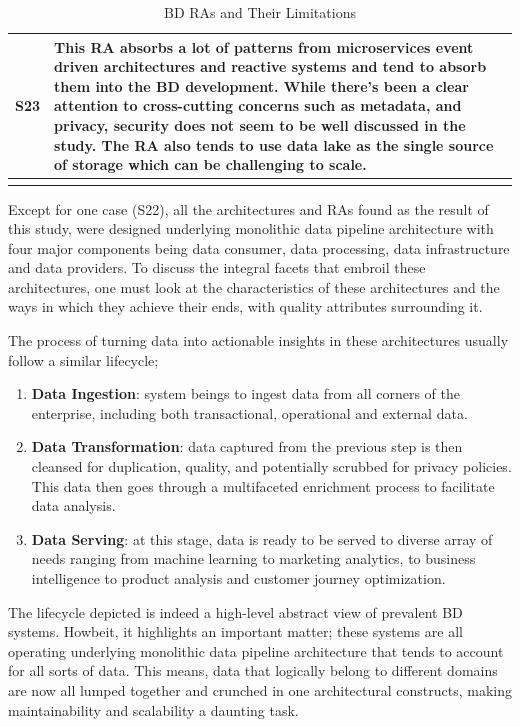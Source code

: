 \documentclass[review]{elsarticle}
\begin{document}
\begin{longtable}{|p{0.5cm}|p{11cm}|}
        \hline
        S23 & This RA absorbs a lot of patterns from microservices event driven architectures and reactive systems and tend to absorb them into the BD development. While there's been a clear attention to cross-cutting concerns such as metadata, and privacy, security does not seem to be well discussed in the study. The RA also tends to use data lake as the single source of storage which can be challenging to scale.  \\
        \hline
        \caption{BD RAs and Their Limitations}
        \label{table:BD-RAs-Limitations}
\end{longtable}

Except for one case (S22), all the architectures and RAs found as the result of this study, were designed underlying monolithic data pipeline architecture with four major components being data consumer, data processing, data infrastructure and data providers. To discuss the integral facets that embroil these architectures, one must
look at the characteristics of these architectures and the ways in which they achieve their ends, with quality attributes surrounding it.

The process of turning data into actionable insights in these architectures usually follow a similar lifecycle;

\begin{enumerate}
    \item \textbf{Data Ingestion}: system beings to ingest data from all corners of the enterprise, including both transactional, operational and external data.
    \item \textbf{Data Transformation}: data captured from the previous step is then cleansed for duplication, quality, and potentially scrubbed for privacy policies. This data then goes through a multifaceted enrichment process to facilitate data analysis.
    \item \textbf{Data Serving}: at this stage, data is ready to be served to diverse array of needs ranging from machine learning to marketing analytics, to business intelligence to product analysis and customer journey optimization.
\end{enumerate}

The lifecycle depicted is indeed a high-level abstract view of prevalent BD systems. Howbeit, it highlights an important matter; these systems are all operating underlying monolithic data pipeline architecture that tends to account for all sorts of data. This means, data that logically belong to different domains are now all lumped together and crunched in one architectural constructs, making maintainability and scalability a daunting task.
\end{document}
